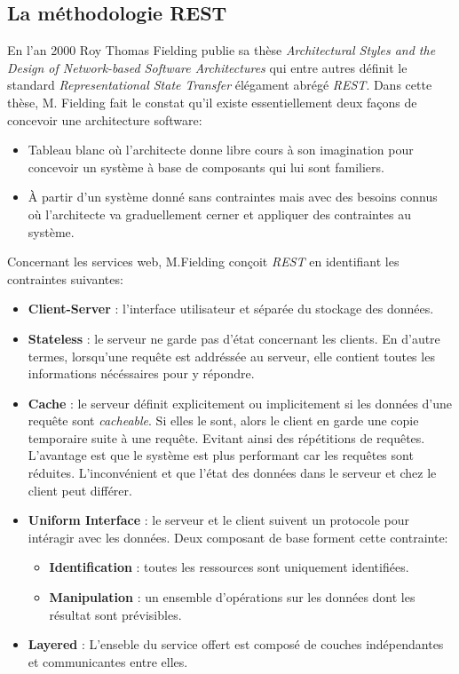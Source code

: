 \subsection{La méthodologie REST}
En l'an 2000 Roy Thomas Fielding publie sa thèse \textit{Architectural Styles and the Design of Network-based Software Architectures} qui entre autres définit le standard \textit{Representational State Transfer} élégament abrégé \textit{REST}. Dans cette thèse, M. Fielding fait le constat qu'il existe essentiellement deux façons de concevoir une architecture software:
\begin{itemize}
    \item Tableau blanc où l'architecte donne libre cours à son imagination pour concevoir un système à base de composants qui lui sont familiers.
    \item À partir d'un système donné sans contraintes mais avec des besoins connus où l'architecte va graduellement cerner et appliquer des contraintes au système.  
\end{itemize}
\smallskip
Concernant les services web, M.Fielding conçoit \textit{REST} en identifiant les contraintes suivantes: 
\smallskip
\begin{itemize}
    \item \textbf{Client-Server} : l'interface utilisateur et séparée du stockage des données.
    \item \textbf{Stateless} : le serveur ne garde pas d'état concernant les clients. En d'autre termes, lorsqu'une requête est addréssée au serveur, elle contient toutes les informations nécéssaires pour y répondre.
    \item \textbf{Cache} : le serveur définit explicitement ou implicitement si les données d'une requête sont \textit{cacheable}. Si elles le sont, alors le client en garde une copie temporaire suite à une requête. Evitant ainsi des répétitions de requêtes. L'avantage est que le système est plus performant car les requêtes sont réduites. L'inconvénient et que l'état des données dans le serveur et chez le client peut différer.
    \item \textbf{Uniform Interface} : le serveur et le client suivent un protocole pour intéragir avec les données. Deux composant de base forment cette contrainte:
    \smallskip
    \begin{itemize}
        \item \textbf{Identification} : toutes les ressources sont uniquement identifiées.
        \item \textbf{Manipulation} : un ensemble d'opérations sur les données dont les résultat sont prévisibles.
    \end{itemize}
    \smallskip
    \item \textbf{Layered} : L'enseble du service offert est composé de couches indépendantes et communicantes entre elles.
\end{itemize}
\smallskip

